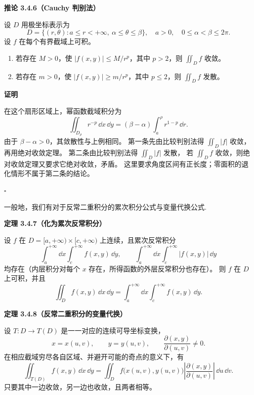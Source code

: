 \textbf{推论 3.4.6（Cauchy 判别法）}


设 $D$ 用极坐标表示为
\[
D=\{(r,\theta):a\le r<+\infty,\ \alpha\le\theta\le\beta\},
\quad a>0,\quad 0\le\alpha<\beta\le2\pi.
\]
设 $f$ 在每个有界截域上可积。
\begin{enumerate}
\item 若存在 $M>0$，使 $|f(x,y)|\le M/r^p$，其中 $p>2$，则 $\displaystyle\iint_Df$ 收敛。
\item 若存在 $m>0$，使 $|f(x,y)|\ge m/r^p$，其中 $p\le2$，则 $\displaystyle\iint_Df$ 发散。
\end{enumerate}





\textbf{证明}

在这个扇形区域上，幂函数截域积分为
\[
\displaystyle\iint_{D_\rho}r^{-p}\,\dd x\,\dd y
=(\beta-\alpha)\int_a^\rho r^{1-p}\,\dd r.
\]
由于 $\beta-\alpha>0$，其敛散性与上例相同。
第一条先由比较判别法得 $\displaystyle\iint_D|f|$ 收敛，再用绝对收敛定理。
第二条由比较判别法得 $\displaystyle\iint_D|f|$ 发散，
若 $\displaystyle\iint_Df$ 收敛，则绝对收敛定理又要求它绝对收敛，矛盾。
这里要求角度区间有正长度；零面积的退化情形不属于第二条的结论。


$\square$


一般地，我们有对于反常二重积分的累次积分公式与变量代换公式.


\textbf{定理 3.4.7（化为累次反常积分）}


设 $f$ 在 $D=[a,+\infty)\times[c,+\infty)$ 上连续，且累次反常积分
\[
\int_a^{+\infty}\dd x\int_c^{+\infty}f(x,y)\,\dd y,
\qquad
\int_a^{+\infty}\dd x\int_c^{+\infty}|f(x,y)|\,\dd y
\]
均存在（内层积分对每个 $x$ 存在，所得函数的外层反常积分也存在）。
则 $f$ 在 $D$ 上可积，并且
\[
\displaystyle\iint_Df(x,y)\,\dd x\,\dd y
=\int_a^{+\infty}\dd x\int_c^{+\infty}f(x,y)\,\dd y.
\]







\textbf{定理 3.4.8（反常二重积分的变量代换）}


设 $T:D\to T(D)$ 是一一对应的连续可导坐标变换，
\[
x=x(u,v),\qquad y=y(u,v),\qquad
\frac{\partial(x,y)}{\partial(u,v)}\ne0.
\]
在相应截域穷尽各自区域、并避开可能的奇点的意义下，有
\[
\displaystyle\iint_{T(D)}f(x,y)\,\dd x\,\dd y
=\displaystyle\iint_Df\bigl(x(u,v),y(u,v)\bigr)
\left|\frac{\partial(x,y)}{\partial(u,v)}\right|\,\dd u\,\dd v.
\]
只要其中一边收敛，另一边也收敛，且两者相等。






